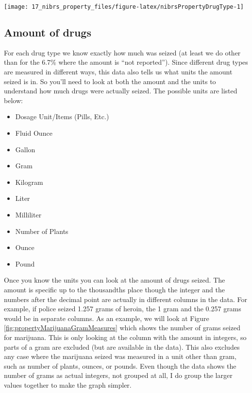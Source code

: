 \documentclass[
]{krantz}
\providecommand{\tightlist}{%
  \setlength{\itemsep}{0pt}\setlength{\parskip}{0pt}}
\let\origfigure\figure
\let\endorigfigure\endfigure
\renewenvironment{figure}[1][2] {
    \expandafter\origfigure\expandafter[H]
} {
    \endorigfigure
}
\begin{document}
\begin{figure}

{\centering \texttt{[image: 17\_nibrs\_property\_files/figure-latex/nibrsPropertyDrugType-1]} 

}

\caption{Annual percent of drug seizures by drug type, for the 1st drug reported, 1991-2023.}\label{fig:nibrsPropertyDrugType}
\end{figure}

\subsection{Amount of drugs}\label{amount-of-drugs}

For each drug type we know exactly how much was seized (at
least we do other than for the 6.7\% where the amount is
``not reported''). Since different drug types are measured
in different ways, this data also tells us what units the
amount seized is in. So you'll need to look at both the
amount and the units to understand how much drugs were
actually seized. The possible units are listed below:

\begin{itemize}
\tightlist
\item
  Dosage Unit/Items (Pills, Etc.)
\item
  Fluid Ounce
\item
  Gallon\\
\item
  Gram
\item
  Kilogram\\
\item
  Liter\\
\item
  Milliliter
\item
  Number of Plants\\
\item
  Ounce
\item
  Pound
\end{itemize}

Once you know the units you can look at the amount of drugs
seized. The amount is specific up to the thousandths place
though the integer and the numbers after the decimal point
are actually in different columns in the data. For example,
if police seized 1.257 grams of heroin, the 1 gram and the
0.257 grams would be in separate columns. As an example, we
will look at Figure \ref{fig:propertyMarijuanaGramMeasures}
which shows the number of grams seized for marijuana. This
is only looking at the column with the amount in integers,
so parts of a gram are excluded (but are available in the
data). This also excludes any case where the marijuana
seized was measured in a unit other than gram, such as
number of plants, ounces, or pounds. Even though the data
shows the number of grams as actual integers, not grouped at
all, I do group the larger values together to make the graph
simpler.
\end{document}
